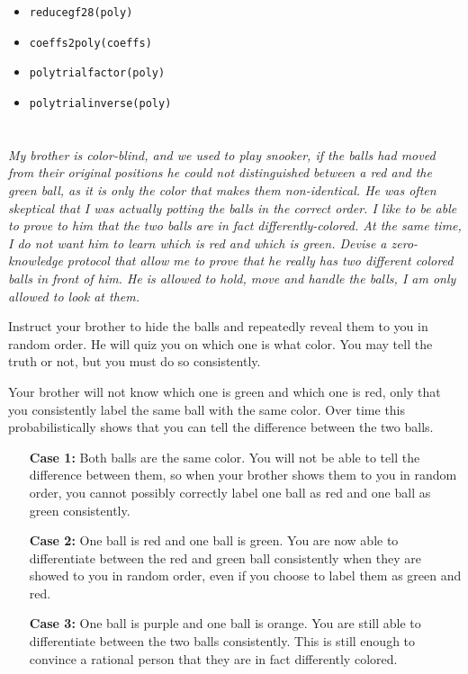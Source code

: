 \documentclass[12pt]{article}
\newcommand{\red}{{\color{red}red}}
\newcommand{\green}{{\color{green}green}}
\newcommand{\purple}{{\color{purple}purple}}
\newcommand{\orange}{{\color{orange}orange}}
\begin{document}
    \begin{itemize}
        \item \texttt{reduce\textunderscore{}gf28(poly)}
        \item \texttt{coeffs2poly(coeffs)}
        \item \texttt{poly\textunderscore{}trial\textunderscore{}factor(poly)}
        \item \texttt{poly\textunderscore{}trial\textunderscore{}inverse(poly)}
    \end{itemize}

\newpage

\section{} \textit{My brother is color-blind, and we used to play snooker, if the balls had moved from their original positions he could not distinguished between a \red{} and the \green{} ball, as it is only the color that makes them non-identical. He was often skeptical that I was actually potting the balls in the correct order. I like to be able to prove to him that the two balls are in fact differently-colored. At the same time, I do not want him to learn which is \red{} and which is \green{}. Devise a zero-knowledge protocol that allow me to prove that he really has two different colored balls in front of him. He is allowed to hold, move and handle the balls, I am only allowed to look at them.}

    Instruct your brother to hide the balls and repeatedly reveal them to you in random order. He will quiz you on which one is what color. You may tell the truth or not, but you must do so consistently.

    Your brother will not know which one is \green{} and which one is \red{}, only that you consistently label the same ball with the same color. Over time this probabilistically shows that you can tell the difference between the two balls.

    \begin{enumerate}
        \item[\textbf{Case 1:}] Both balls are the same color. You will not be able to tell the difference between them, so when your brother shows them to you in random order, you cannot possibly correctly label one ball as \red{} and one ball as \green{} consistently.

        \item[\textbf{Case 2:}] One ball is \red{} and one ball is \green{}. You are now able to differentiate between the \red{} and \green{} ball consistently when they are showed to you in random order, even if you choose to label them as {\color{red}green} and {\color{green}red}.

        \item[\textbf{Case 3:}] One ball is \purple{} and one ball is \orange{}. You are still able to differentiate between the two balls consistently. This is still enough to convince a rational person that they are in fact differently colored.
    \end{enumerate}
\end{document}
